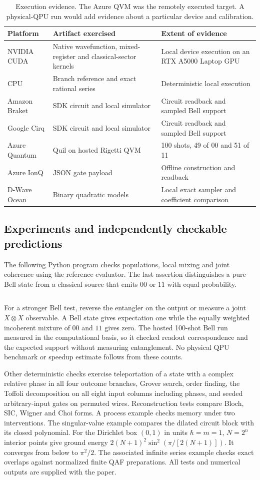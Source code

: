 \begin{table}[ht]
\centering\small
\begin{tabularx}{\linewidth}{@{}lXX@{}}
\toprule Platform & Artifact exercised & Extent of evidence\\\midrule
NVIDIA CUDA & Native wavefunction, mixed-register and classical-sector kernels & Local device execution on an RTX A5000 Laptop GPU\\
CPU & Branch reference and exact rational series & Deterministic local execution\\
Amazon Braket & SDK circuit and local simulator & Circuit readback and sampled Bell support\\
Google Cirq & SDK circuit and local simulator & Circuit readback and sampled Bell support\\
Azure Quantum & Quil on hosted Rigetti QVM & 100 shots, 49 of 00 and 51 of 11\\
Azure IonQ & JSON gate payload & Offline construction and readback\\
D-Wave Ocean & Binary quadratic models & Local exact sampler and coefficient comparison\\
\bottomrule
\end{tabularx}
\caption{Execution evidence. The Azure QVM was the remotely executed target. A physical-QPU run would add evidence about a particular device and calibration.}\label{tab:platforms}
\end{table}

\subsection{Experiments and independently checkable predictions}
The following Python program checks populations, local mixing and joint coherence using the reference evaluator. The last assertion distinguishes a pure Bell state from a classical source that emits $00$ or $11$ with equal probability.
\inputminted[fontsize=\footnotesize]{python}{examples/check_callable.py}
For a stronger Bell test, reverse the entangler on the output or measure a joint $X\otimes X$ observable. A Bell state gives expectation one while the equally weighted incoherent mixture of $00$ and $11$ gives zero. The hosted 100-shot Bell run measured in the computational basis, so it checked readout correspondence and the expected support without measuring entanglement. No physical QPU benchmark or speedup estimate follows from these counts.

Other deterministic checks exercise teleportation of a state with a complex relative phase in all four outcome branches, Grover search, order finding, the Toffoli decomposition on all eight input columns including phases, and seeded arbitrary-input gates on permuted wires. Reconstruction tests compare Bloch, SIC, Wigner and Choi forms. A process example checks memory under two interventions. The singular-value example compares the dilated circuit block with its closed polynomial. For the Dirichlet box $(0,1)$ in units $\hbar=m=1$, $N=2^n$ interior points give ground energy $2(N+1)^2\sin^2(\pi/[2(N+1)])$. It converges from below to $\pi^2/2$. The associated infinite series example checks exact overlaps against normalized finite QAF preparations. All tests and numerical outputs are supplied with the paper.
